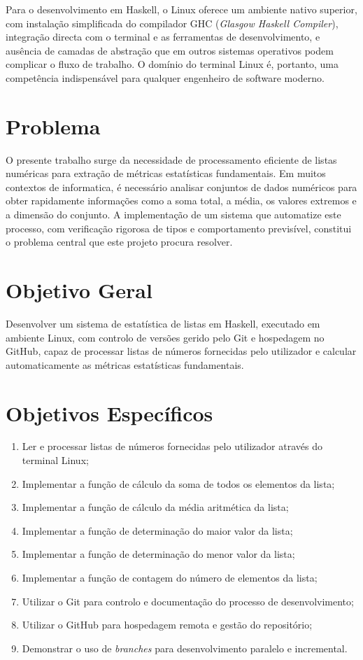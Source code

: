 \documentclass[12pt, a4paper, oneside]{report}
\begin{document}
Para o desenvolvimento em Haskell, o Linux oferece um ambiente nativo superior, com instalação simplificada do compilador GHC (\textit{Glasgow Haskell Compiler}), integração directa com o terminal e as ferramentas de desenvolvimento, e ausência de camadas de abstração que em outros sistemas operativos podem complicar o fluxo de trabalho. O domínio do terminal Linux é, portanto, uma competência indispensável para qualquer engenheiro de software moderno.

\section{Problema}

O presente trabalho surge da necessidade de processamento eficiente de listas numéricas para extração de métricas estatísticas fundamentais. Em muitos contextos de informatica, é necessário analisar conjuntos de dados numéricos para obter rapidamente informações como a soma total, a média, os valores extremos e a dimensão do conjunto. A implementação de um sistema que automatize este processo, com verificação rigorosa de tipos e comportamento previsível, constitui o problema central que este projeto procura resolver.

\section{Objetivo Geral}

Desenvolver um sistema de estatística de listas em Haskell, executado em ambiente Linux, com controlo de versões gerido pelo Git e hospedagem no GitHub, capaz de processar listas de números fornecidas pelo utilizador e calcular automaticamente as métricas estatísticas fundamentais.

\section{Objetivos Específicos}

\begin{enumerate}[label=\arabic*.]
  \item Ler e processar listas de números fornecidas pelo utilizador através do terminal Linux;
  \item Implementar a função de cálculo da soma de todos os elementos da lista;
  \item Implementar a função de cálculo da média aritmética da lista;
  \item Implementar a função de determinação do maior valor da lista;
  \item Implementar a função de determinação do menor valor da lista;
  \item Implementar a função de contagem do número de elementos da lista;
  \item Utilizar o Git para controlo e documentação do processo de desenvolvimento;
  \item Utilizar o GitHub para hospedagem remota e gestão do repositório;
  \item Demonstrar o uso de \textit{branches} para desenvolvimento paralelo e incremental.
\end{enumerate}
\end{document}
